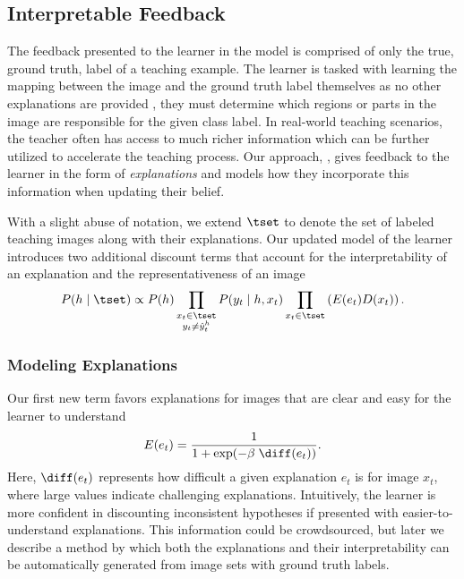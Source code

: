 \documentclass[../main.tex]{subfiles}
\begin{document}
\subsection{Interpretable Feedback}
The feedback presented to the learner in the \STRICT model is comprised of only the true, ground truth, label of a teaching example. The learner is tasked with learning the mapping between the image and the ground truth label themselves as no other explanations are provided \ie, they must determine which regions or parts in the image are responsible for the given class label. 
In real-world teaching scenarios, the teacher often has access to much richer information which can be further utilized to accelerate the teaching process.
Our approach, \EXPLAIN, gives feedback to the learner in the form of \emph{explanations} and models how they incorporate this information when updating their belief.

With a slight abuse of notation, we extend $\tset$ to denote the set of labeled teaching images along with their explanations. Our updated model of the learner introduces two additional discount terms that account for the interpretability of an explanation and the representativeness of an image
\begin{equation}
P(h\mid \tset) \propto P(h) \prod\limits_{\substack {x_t\in{} \tset\\y_t \neq \hat{y}^h_t}} P(y_t\mid h, x_t) \prod\limits_{x_t\in \tset}\left(E(e_t) D(x_t)\right).
\end{equation}


\subsubsection*{Modeling Explanations}
Our first new term favors explanations for images that are clear and easy for the learner to understand
\begin{equation}
   E(e_t) = \frac{1}{1 + \exp(-\beta\; \diff(e_t))}.
   \label{eqn:explanation}
\end{equation}
Here, $\diff(e_t)$ represents how difficult a given explanation $e_t$ is for image $x_t$, where large values indicate challenging explanations.
Intuitively, the learner is more confident in discounting inconsistent hypotheses if presented with easier-to-understand explanations.
This information could be crowdsourced, but later we describe a method by which both the explanations and their interpretability can be automatically generated from image sets with ground truth labels.
\end{document}
